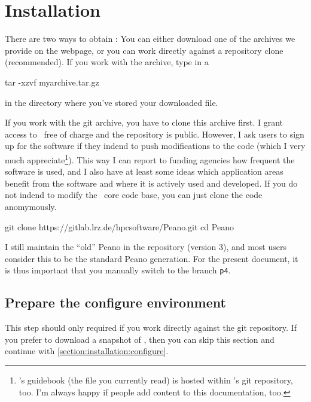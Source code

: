 \chapter{Installation}

There are two ways to obtain \Peano: 
You can either download one of the archives we provide on the webpage, or you
can work directly against a repository clone (recommended).
If you work with the archive, type in a 
\begin{code}
tar -xzvf myarchive.tar.gz
\end{code}
in the directory where you've stored your downloaded file.


If you work with the git archive, you have to clone this archive first. 
I grant access to \Peano\  free of charge and the repository is public.
However, I ask users to sign up for the software if they indend to push
modifications to the code (which I very much appreciate\footnote{\Peano's
guidebook (the file you currently read) is hosted within \Peano's git
repository, too. I'm always happy if people add content to this
documentation, too.}).
This way I can report to funding agencies how frequent the software is used, and
I also have at least some ideas which application areas benefit from the
software and where it is actively used and developed.
If you do not indend to modify the \Peano\ core code base, you can just clone
the code anomymously.

\begin{code}
git clone https://gitlab.lrz.de/hpcsoftware/Peano.git
cd Peano
\end{code}
\label{page::installation::git-clone}


\begin{remark}
I still maintain the ``old'' Peano in the repository (version 3), and most users
consider this to be the standard Peano generation.
For the present document, it is thus important that you manually switch to the
branch \texttt{p4}.
\end{remark}



\section{Prepare the configure environment}

This step should only required if you work directly against the git repository.
If you prefer to download a snapshot of \Peano, then you can skip this section
and continue with \ref{section:installation:configure}.


